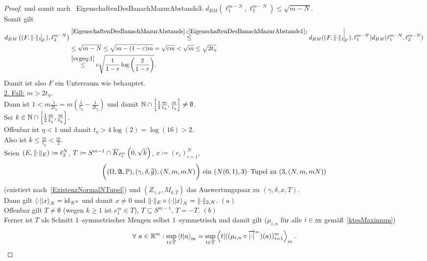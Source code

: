 \begin{proof}
und somit nach~
{EigenschaftenDesBanachMazurAbstands3}: $d_{BM}(\ell_1^{m-N}, \ell_2^{m-N}) \le
\sqrt{m-N}$.\\
Somit gilt
\begin{align*}
d_{BM}\left((F,\restrict{\norm\cdot_1}F), \ell_2^{m-N}\right)
&\overset{\refclaim{EigenschaftenDesBanachMazurAbstands}
{EigenschaftenDesBanachMazurAbstands1}}\le
d_{BM}((F,\restrict{\norm\cdot_1}{F}), \ell_1^{m-N})d_{BM}
(\ell_1^{m-N}, \ell_2^{m-N})\\
& \le \sqrt{m-N} \le \sqrt{m - (1-\eps)m} = \sqrt{\eps m} < \sqrt{m}
\le \sqrt{2t_\eta}\\
&\overset{\eqref{svgeq:1}}\le
c \sqrt{\frac 1 {1-\eps}\log\left(\frac 2{1-\eps} \right)}
\text.
\end{align*}
Damit ist also $F$ ein Unterraum wie behauptet.\\
\underline{2. Fall:} $m > 2t_\eta$.\\
Dann ist $1<m\frac1{2t_\eta}=m\left(\frac1{t_\eta}-\frac1{2t_\eta}\right)$ und
damit $\mathbb{N} \cap \left[\frac 1 2 \frac m {t_\eta}, \frac m {t_\eta}\right]
\neq \emptyset$.\\
Sei $k\in\mathbb{N}\cap\left[\frac12\frac m{t_\eta},\frac m{t_\eta}\right]$.\\
Offenbar ist $\eta < 1$ und damit $t_\eta > 4 \log(2) = \log(16) > 2$.\\
Also ist $k \le \frac m {t_\eta} < \frac m 2$.\\
Seien $(E,\lVert\cdot\rVert_E)\coloneqq \ell_2^N$, $T\coloneqq S^{m-1}\cap\overline K_{\ell_1^m}\left(0, \sqrt k\right)$,
$x \coloneqq  (e_i)_{i = 1}^N$,
\[\bigg((\Omega, \mathfrak{A}, \mathbb{P}), (\gamma,\delta,\widetilde g),(N, m, mN)\bigg)
\text{ ein }(N(0,1), 3)\text{--Tupel zu }(3,(N,m,mN))\] (existiert nach~\ref{ExistenzNormalNTupel}) und $(Z_{\gamma, x}, M_{\delta,T})$ das
Auswertungspaar zu $(\gamma, \delta, x, T)$.\\
Dann gilt $\left\langle \cdot ||x\right\rangle_N = \text{id}\,_{\mathbb{R}^N}$ und damit $x \neq 0$ und
$\lVert\cdot\rVert_E\circ\left\langle \cdot ||x\right\rangle _N=\lVert\cdot\rVert_{2,N}$. \hfill $(a)$\\
Offenbar gilt $T \neq \emptyset$ (wegen $k \ge 1$ ist $e_1^m \in T$),
$T \subseteq S^{m-1}$, $T=-T$. \hfill $(b)$\\
Ferner ist $T$ als Schnitt $1$--symmetrischer Mengen selbst $1$--symmetrisch
und damit gilt ($\mu_{i,n}$ für alle $i \in \haken m$ gemäß~\ref{ktesMaximum})
\begin{align}
\forall\ a \in \R^m : \sup_{t \in T} \sprod t a_m = \sup_{t \in T} \sprod
t {((\mu_{i,n}\circ \pfeil {\abs\cdot} m)(a))_{i=1}^m}_m \text.\label{svgeq:2}

\end{align}
\end{proof}
